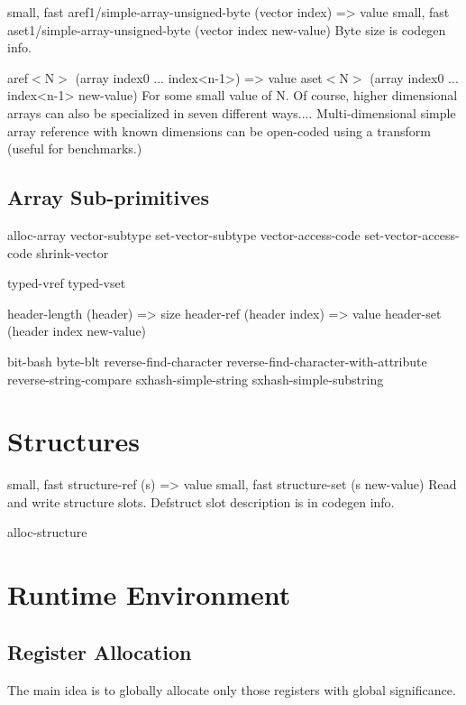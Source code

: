 {\begin{itemize, spread 0, spacing 1}
{small, fast} aref1/simple-array-unsigned-byte (vector index) => value
{small, fast} aset1/simple-array-unsigned-byte (vector index new-value)
    Byte size is codegen info.

aref$<$N$>$ (array index0 ... index<n-1>) => value
aset$<$N$>$ (array index0 ... index<n-1> new-value)
    For some small value of N.  Of course, higher dimensional arrays can also
    be specialized in seven different ways....  Multi-dimensional simple array
    reference with known dimensions can be open-coded using a transform (useful
    for benchmarks.)



\section{Array Sub-primitives}

alloc-array
vector-subtype
set-vector-subtype
vector-access-code
set-vector-access-code
shrink-vector

typed-vref
typed-vset

header-length (header) => size
header-ref (header index) => value
header-set (header index new-value)

bit-bash
byte-blt
{reverse-}find-character
{reverse-}find-character-with-attribute
{reverse-}string-compare
sxhash-simple-string
sxhash-simple-substring


\chapter{Structures}

{small, fast} structure-ref (s) => value
{small, fast} structure-set (s new-value)
    Read and write structure slots.  Defstruct slot description is in codegen
    info.

alloc-structure


\chapter{Runtime Environment}
\label{Runtime}


\section{Register Allocation}

The main idea is to globally allocate only those registers with global
significance.


\end{itemize, spread 0, spacing 1}}
